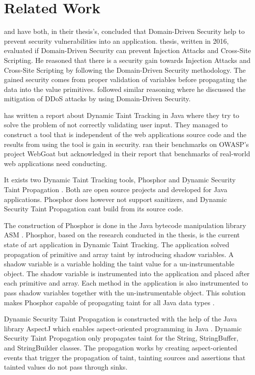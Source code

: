 \chapter{Related Work}
\textcite{Stendahl2016} and \textcite{Arnor2016} have both, in their thesis's, concluded that Domain-Driven Security help to prevent security vulnerabilities into an application. \textcite{Stendahl2016} thesis, written in 2016, evaluated if Domain-Driven Security can prevent Injection Attacks and Cross-Site Scripting. He reasoned that there is a security gain towards Injection Attacks and Cross-Site Scripting by following the Domain-Driven Security methodology. The gained security comes from proper validation of variables before propagating the data into the value primitives. \textcite{Arnor2016} followed similar reasoning where he discussed the mitigation of DDoS attacks by using Domain-Driven Security.

\textcite{Haldar} has written a report about Dynamic Taint Tracking in Java where they try to solve the problem of not correctly validating user input. They managed to construct a tool that is independent of the web applications source code and the results from using the tool is gain in security. \textcite{Haldar} ran their benchmarks on OWASP’s project WebGoat \parencite{webgoat} but acknowledged in their report that benchmarks of real-world web applications need conducting.

It exists two Dynamic Taint Tracking tools, Phosphor \parencite{phosphor} and Dynamic Security Taint Propagation \parencite{securityTaint}. Both are open source projects and developed for Java applications. Phosphor does however not support sanitizers, and Dynamic Security Taint Propagation cant build from its source code.

The construction of Phosphor \parencite{phosphor} is done in the Java bytecode manipulation library ASM \parencite{asm}. Phosphor, based on the research conducted in the thesis, is the current state of art application in Dynamic Taint Tracking. The application solved propagation of primitive and array taint by introducing shadow variables. A shadow variable is a variable holding the taint value for a un-instrumentable object. The shadow variable is instrumented into the application and placed after each primitive and array. Each method in the application is also instrumented to pass shadow variables together with the un-instrumentable object. This solution makes Phosphor capable of propagating taint for all Java data types \parencite{BellJ.2014PIdd}.

Dynamic Security Taint Propagation \parencite{securityTaint} is constructed with the help of the Java library AspectJ which enables aspect-oriented programming in Java \parencite{aspectj}. Dynamic Security Taint Propagation only propagates taint for the String, StringBuffer, and StringBuilder classes. The propagation works by creating aspect-oriented events that trigger the propagation of taint, tainting sources and assertions that tainted values do not pass through sinks.